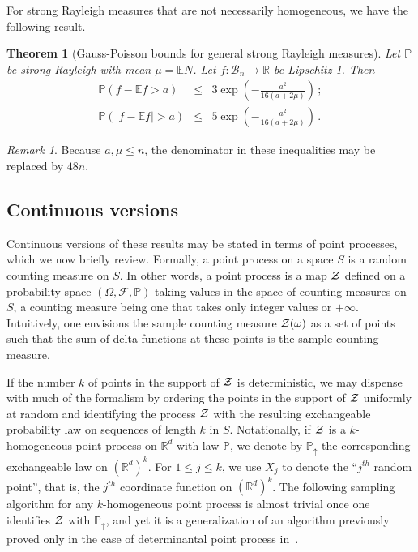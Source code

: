 \documentclass[10pt]{article}
\theoremstyle{plain}
\newtheorem{thm}{Theorem}[section]
\theoremstyle{remark}
\newtheorem*{unremark}{Remark}
\def\R{\mathbb{R}}
\def\E{{\mathbb E}}
\def\P{{\mathbb P}}
\def\F{{\mathcal F}}
\def\B{{\mathcal B}}
\def\PZ{\P_{\uparrow}}
\def\ZZ{{\cal Z}}
\def\mean{\mu}
\begin{document}
For strong Rayleigh measures that are not necessarily homogeneous,
we have the following result.
%
\begin{thm}[Gauss-Poisson bounds for general strong Rayleigh measures]
\label{th:general}
Let $\P$ be strong Rayleigh with mean $\mean = \E N$.
Let $f : \B_n \to \R$ be Lipschitz-1.  Then
\begin{eqnarray*}
\P (f - \E f > a) & \leq &
   3 \exp \left ( - \frac{a^2}{16 (a + 2 \mean)} \right ) \, ;  \\[1ex]
\P (|f - \E f| > a) & \leq &
   5 \exp \left ( - \frac{a^2}{16 (a + 2 \mean)} \right ) \, .
\end{eqnarray*}
\end{thm}
\begin{unremark}
Because $a, \mean \leq n$, the denominator in these inequalities
may be replaced by $48 n$.
\end{unremark}

\subsection*{Continuous versions}

Continuous versions of these results may be stated in terms of
point processes, which we now briefly review.  Formally, a point
process on a space $S$ is a random counting measure on $S$.
In other words, a point process is a map $\ZZ$ defined on a
probability space $(\Omega , \F , \P)$ taking values in the
space of counting measures on $S$, a counting measure being
one that takes only integer values or $+\infty$.
Intuitively, one envisions the sample counting measure
$\ZZ (\omega)$ as a set of points such that the sum of
delta functions at these points is the sample counting measure.

If the number $k$ of points in the support of $\ZZ$ is
deterministic, we may dispense with much of the formalism
by ordering the points in the support of $\ZZ$ uniformly
at random and identifying the process $\ZZ$ with the resulting
exchangeable probability law on sequences of length $k$ in $S$.
Notationally, if $\ZZ$ is a $k$-homogeneous point process on
$\R^d$ with law $\P$, we denote by $\PZ$ the corresponding
exchangeable law on $(\R^d)^k$.  For $1 \leq j \leq k$,
we use $X_j$ to denote the ``$j^{th}$ random point'', that
is, the $j^{th}$ coordinate function on $(\R^d)^k$.
The following sampling algorithm for any $k$-homogeneous
point process is almost trivial once one identifies $\ZZ$
with $\PZ$, and yet it is a generalization of an algorithm
previously proved only in the case of determinantal point
process in~\cite[Proposition~4.4.3]{HKPV}.
\end{document}
